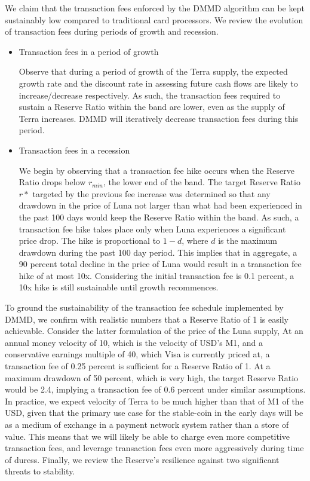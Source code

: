 \documentclass{article}
\begin{document}
We claim that the transaction fees enforced by the DMMD algorithm can be kept sustainably low compared to traditional card processors. We review the evolution of transaction fees during periods of growth and recession.


\begin{itemize}
    \item Transaction fees in a period of growth
    
    Observe that during a period of growth of the Terra supply, the expected growth rate and the discount rate in assessing future cash flows are likely to increase/decrease respectively. As such, the transaction fees required to sustain a Reserve Ratio within the band are lower, even as the supply of Terra increases. DMMD will iteratively decrease transaction fees during this period.
    
    \item Transaction fees in a recession
    
    We begin by observing that a transaction fee hike occurs when the Reserve Ratio drops below $r_{min}$, the lower end of the band. The target Reserve Ratio $r*$ targeted by the previous fee increase was determined so that any drawdown in the price of Luna not larger than what had been experienced in the past 100 days would keep the Reserve Ratio within the band. As such, a transaction fee hike takes place only when Luna experiences a significant price drop. The hike is proportional to $1-d$, where $d$ is the maximum drawdown during the past 100 day period. This implies that in aggregate, a 90 percent total decline in the price of Luna would result in a transaction fee hike of at most 10x. Considering the initial transaction fee is 0.1 percent, a 10x hike is still sustainable until growth recommences.
\end{itemize}
    
To ground the sustainability of the transaction fee schedule implemented by DMMD, we confirm with realistic numbers that a Reserve Ratio of 1 is easily achievable. Consider the latter formulation of the price of the Luna supply, At an annual money velocity of 10, which is the velocity of USD's M1, and a conservative earnings multiple of 40, which Visa is currently priced at, a transaction fee of 0.25 percent is sufficient for a Reserve Ratio of 1. At a maximum drawdown of 50 percent, which is very high, the target Reserve Ratio would be 2.4, implying a transaction fee of 0.6 percent under similar assumptions. In practice, we expect velocity of Terra to be much higher than that of M1 of the USD, given that the primary use case for the stable-coin in the early days will be as a medium of exchange in a payment network system rather than a store of value. This means that we will likely be able to charge even more competitive transaction fees, and leverage transaction fees even more aggressively during time of duress. 
Finally, we review the Reserve's resilience against two significant threats to stability.
\end{document}
